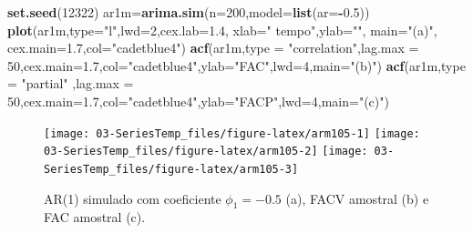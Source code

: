 \documentclass[
]{book}
\newenvironment{Shaded}{\begin{snugshade}}{\end{snugshade}}
\newcommand{\DataTypeTok}[1]{\textcolor[rgb]{0.13,0.29,0.53}{#1}}
\newcommand{\DecValTok}[1]{\textcolor[rgb]{0.00,0.00,0.81}{#1}}
\newcommand{\FloatTok}[1]{\textcolor[rgb]{0.00,0.00,0.81}{#1}}
\newcommand{\KeywordTok}[1]{\textcolor[rgb]{0.13,0.29,0.53}{\textbf{#1}}}
\newcommand{\NormalTok}[1]{#1}
\newcommand{\OperatorTok}[1]{\textcolor[rgb]{0.81,0.36,0.00}{\textbf{#1}}}
\newcommand{\StringTok}[1]{\textcolor[rgb]{0.31,0.60,0.02}{#1}}
\theoremstyle{definition}
\theoremstyle{definition}
\theoremstyle{definition}
\theoremstyle{remark}
\begin{document}
\begin{Shaded}
\begin{Highlighting}[]
\KeywordTok{set.seed}\NormalTok{(}\DecValTok{12322}\NormalTok{)}
\NormalTok{ar1m=}\KeywordTok{arima.sim}\NormalTok{(}\DataTypeTok{n=}\DecValTok{200}\NormalTok{,}\DataTypeTok{model=}\KeywordTok{list}\NormalTok{(}\DataTypeTok{ar=}\OperatorTok{-}\FloatTok{0.5}\NormalTok{))}
\KeywordTok{plot}\NormalTok{(ar1m,}\DataTypeTok{type=}\StringTok{"l"}\NormalTok{,}\DataTypeTok{lwd=}\DecValTok{2}\NormalTok{,}\DataTypeTok{cex.lab=}\FloatTok{1.4}\NormalTok{, }\DataTypeTok{xlab=}\StringTok{" tempo"}\NormalTok{,}\DataTypeTok{ylab=}\StringTok{""}\NormalTok{, }\DataTypeTok{main=}\StringTok{"(a)"}\NormalTok{, }\DataTypeTok{cex.main=}\FloatTok{1.7}\NormalTok{,}\DataTypeTok{col=}\StringTok{"cadetblue4"}\NormalTok{)}
\KeywordTok{acf}\NormalTok{(ar1m,}\DataTypeTok{type =} \StringTok{"correlation"}\NormalTok{,}\DataTypeTok{lag.max =} \DecValTok{50}\NormalTok{,}\DataTypeTok{cex.main=}\FloatTok{1.7}\NormalTok{,}\DataTypeTok{col=}\StringTok{"cadetblue4"}\NormalTok{,}\DataTypeTok{ylab=}\StringTok{"FAC"}\NormalTok{,}\DataTypeTok{lwd=}\DecValTok{4}\NormalTok{,}\DataTypeTok{main=}\StringTok{"(b)"}\NormalTok{)}
\KeywordTok{acf}\NormalTok{(ar1m,}\DataTypeTok{type =} \StringTok{"partial"}\NormalTok{ ,}\DataTypeTok{lag.max =} \DecValTok{50}\NormalTok{,}\DataTypeTok{cex.main=}\FloatTok{1.7}\NormalTok{,}\DataTypeTok{col=}\StringTok{"cadetblue4"}\NormalTok{,}\DataTypeTok{ylab=}\StringTok{"FACP"}\NormalTok{,}\DataTypeTok{lwd=}\DecValTok{4}\NormalTok{,}\DataTypeTok{main=}\StringTok{"(c)"}\NormalTok{)}
\end{Highlighting}
\end{Shaded}

\begin{figure}
\texttt{[image: 03-SeriesTemp\_files/figure-latex/arm105-1]} \texttt{[image: 03-SeriesTemp\_files/figure-latex/arm105-2]} \texttt{[image: 03-SeriesTemp\_files/figure-latex/arm105-3]} \caption{AR(1) simulado com coeficiente $\phi_1=-0.5$ (a), FACV amostral (b) e FAC amostral (c).}\label{fig:arm105}
\end{figure}
\end{document}
